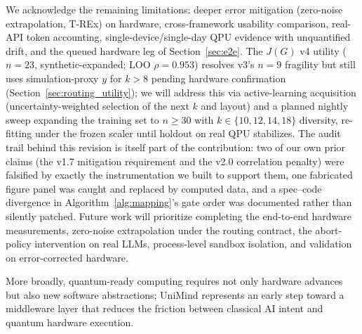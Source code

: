 ﻿\documentclass[12pt,a4paper]{article}
\begin{document}
We acknowledge the remaining limitations: deeper error mitigation (zero-noise extrapolation, T-REx) on hardware, cross-framework usability comparison, real-API token accounting, single-device/single-day QPU evidence with unquantified drift, and the queued hardware leg of Section~\ref{sec:e2e}. The $J(G)$ v4 utility ($n{=}23$, synthetic-expanded; LOO $\rho{=}0.953$) resolves v3's $n{=}9$ fragility but still uses simulation-proxy $y$ for $k{>}8$ pending hardware confirmation (Section~\ref{sec:routing_utility}); we will address this via active-learning acquisition (uncertainty-weighted selection of the next $k$ and layout) and a planned nightly sweep expanding the training set to $n{\ge}30$ with $k{\in}\{10,12,14,18\}$ diversity, re-fitting under the frozen scaler until holdout on real QPU stabilizes. The audit trail behind this revision is itself part of the contribution: two of our own prior claims (the v1.7 mitigation requirement and the v2.0 correlation penalty) were falsified by exactly the instrumentation we built to support them, one fabricated figure panel was caught and replaced by computed data, and a spec--code divergence in Algorithm~\ref{alg:mapping}'s gate order was documented rather than silently patched. Future work will prioritize completing the end-to-end hardware measurements, zero-noise extrapolation under the routing contract, the abort-policy intervention on real LLMs, process-level sandbox isolation, and validation on error-corrected hardware.

More broadly, quantum-ready computing requires not only hardware advances but also new software abstractions; UniMind represents an early step toward a middleware layer that reduces the friction between classical AI intent and quantum hardware execution.
\end{document}
